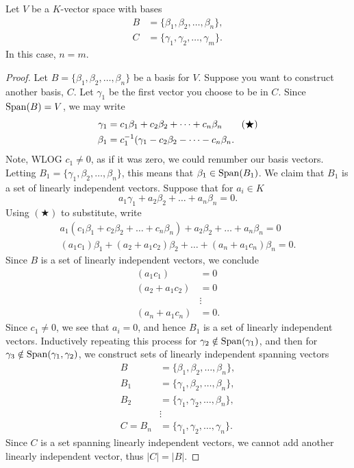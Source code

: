 \documentclass{ximera}
\begin{document}
\begin{theorem}
  Let $V$ be a $K$-vector space with bases
  \begin{align*}
    B &= \{\beta_1,\beta_2,\dots, \beta_n\}, \\
    C &= \{\gamma_1,\gamma_2, \dots, \gamma_m\}.
  \end{align*}
  In this case, $n = m$.
  \begin{proof}
    Let $B= \{\beta_1,\beta_2,\dots, \beta_n\}$ be a basis for $V$.
    Suppose you want to construct another basis, $C$.  Let $\gamma_1$
    be the first vector you choose to be in $C$. Since $\operatorname{Span}(B) = V$,
    we may write
    \begin{align}
      \gamma_1 &= c_1\beta_1 + c_2\beta_2 + \dots + c_n\beta_n \tag{$\bigstar$}\\
      \beta_1 &= c_1^{-1}(\gamma_1 -  c_2\beta_2 - \dots - c_n\beta_n.\notag
    \end{align}
    Note, WLOG $c_1 \ne 0$, as if it was zero, we could renumber our
    basis vectors.  Letting $B_1 = \{\gamma_1, \beta_2,\dots,
    \beta_n\}$, this means that $\beta_1\in \operatorname{Span}(B_1)$. We claim that
    $B_1$ is a set of linearly independent vectors. Suppose that for
    $a_i\in K$
    \[
    a_1 \gamma_1 + a_2 \beta_2 + \dots + a_n \beta_n = 0.
    \]
    Using $(\bigstar)$ to substitute, write
    \begin{align*}
      a_1(c_1\beta_1 + c_2\beta_2 + \dots + c_n\beta_n) + a_2 \beta_2 + \dots + a_n \beta_n = 0\\
      (a_1c_1) \beta_1 + (a_2+a_1c_2)\beta_2 + \dots + (a_n+a_1c_n)\beta_n = 0.
    \end{align*}
    Since $B$ is a set of linearly independent vectors, we conclude
    \begin{align*}
      (a_1c_1) &=0\\
      (a_2+a_1c_2) &=0\\
      &\vdots \\      
      (a_n+a_1c_n) &=0.
    \end{align*}
    Since $c_1\ne 0$, we see that $a_i = 0$, and hence $B_1$ is a set
    of linearly independent vectors. Inductively repeating this
    process for $\gamma_2\notin \operatorname{Span}(\gamma_1)$, and then for
    $\gamma_3 \notin \operatorname{Span}(\gamma_1,\gamma_2)$, we construct sets of
    linearly independent spanning vectors
    \begin{align*}
      B &= \{\beta_1,\beta_2,\dots,\beta_n\},\\
      B_1 &= \{\gamma_1,\beta_2,\dots,\beta_n\},\\
      B_2 &= \{\gamma_1,\gamma_2,\dots,\beta_n\},\\
      &\vdots \\
      C = B_n &= \{\gamma_1,\gamma_2,\dots,\gamma_n\}.
    \end{align*}
    Since $C$ is a set spanning linearly independent vectors, we
    cannot add another linearly independent vector, thus $|C| = |B|$.
  \end{proof}
\end{theorem}
\end{document}
